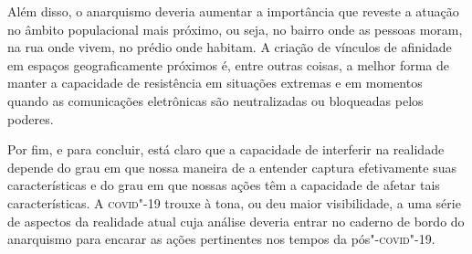 Além disso, o anarquismo deveria aumentar a importância que reveste a
atuação no âmbito populacional mais próximo, ou seja, no bairro onde as
pessoas moram, na rua onde vivem, no prédio onde habitam. A criação de
vínculos de afinidade em espaços geograficamente próximos é, entre
outras coisas, a melhor forma de manter a capacidade de resistência em
situações extremas e em momentos quando as comunicações eletrônicas são
neutralizadas ou bloqueadas pelos poderes.

Por fim, e para concluir, está claro que a capacidade de interferir na
realidade depende do grau em que nossa maneira de a entender captura
efetivamente suas características e do grau em que nossas ações têm a
capacidade de afetar tais características. A \textsc{covid}"-19 trouxe à tona, ou
deu maior visibilidade, a uma série de aspectos da realidade atual cuja
análise deveria entrar no caderno de bordo do anarquismo para encarar as
ações pertinentes nos tempos da pós"-\textsc{covid}"-19.



%
%
%


